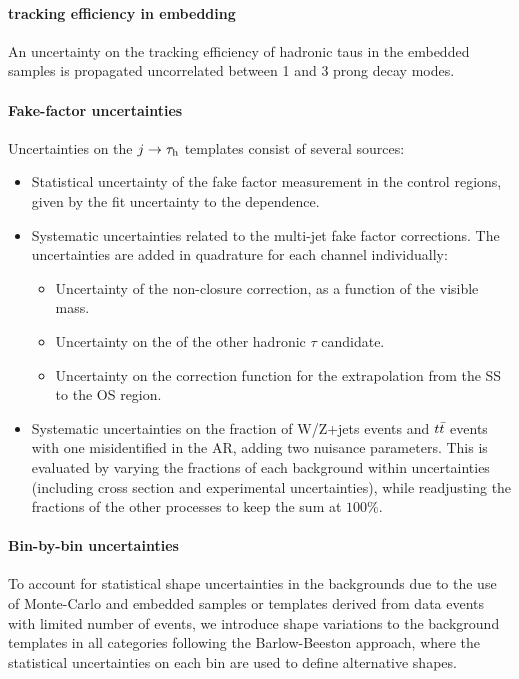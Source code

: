 \paragraph{\tauh tracking efficiency in embedding} An uncertainty on the tracking efficiency of hadronic taus in the embedded samples is propagated uncorrelated between 1 and 3 prong decay modes.

\paragraph{Fake-factor uncertainties} Uncertainties on the $j \rightarrow \tau_{\rm h}$ templates consist of several sources:
\begin{itemize}
    \item Statistical uncertainty of the fake factor measurement in the control regions, given by the fit uncertainty to the \pt dependence.
    \item Systematic uncertainties related to the multi-jet fake factor corrections. The uncertainties are added in quadrature for each channel individually:
    \begin{itemize}
        \item Uncertainty of the non-closure correction, as a function of the visible mass.
        \item Uncertainty on the \pt of the other hadronic $\tau$ candidate.
        \item Uncertainty on the correction function for the extrapolation from the SS to the OS region.
    \end{itemize}
    \item Systematic uncertainties on the fraction of W/Z+jets events and $t\Bar{t}$ events with one misidentified \tauh in the AR, adding two nuisance parameters. This is evaluated by varying the fractions of each background within uncertainties (including cross section and experimental uncertainties), while readjusting the fractions of the other processes to keep the sum at $100\%$.
\end{itemize}

\paragraph{Bin-by-bin uncertainties} To account for statistical shape uncertainties in the backgrounds due to the use of Monte-Carlo and embedded samples or templates derived from data events with limited number of events, we introduce shape variations to the background templates in all categories following the Barlow-Beeston approach, where the statistical uncertainties on each bin are used to define alternative shapes.

